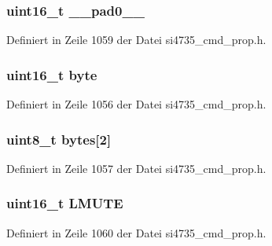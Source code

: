 \subsubsection[{\+\_\+\+\_\+pad0\+\_\+\+\_\+}]{\setlength{\rightskip}{0pt plus 5cm}uint16\+\_\+t \+\_\+\+\_\+pad0\+\_\+\+\_\+}\label{unionrx__hard__mute_a77132c2c26a75f5b8751b235cda23828}


Definiert in Zeile 1059 der Datei si4735\+\_\+cmd\+\_\+prop.\+h.

\hypertarget{unionrx__hard__mute_ab0549c1b5ea980a02e7eab77e21fea49}{}
\subsubsection[{byte}]{\setlength{\rightskip}{0pt plus 5cm}uint16\+\_\+t byte}\label{unionrx__hard__mute_ab0549c1b5ea980a02e7eab77e21fea49}


Definiert in Zeile 1056 der Datei si4735\+\_\+cmd\+\_\+prop.\+h.

\hypertarget{unionrx__hard__mute_a46e4c05d20a047ec169f60d3167e912e}{}
\subsubsection[{bytes}]{\setlength{\rightskip}{0pt plus 5cm}uint8\+\_\+t bytes\mbox{[}2\mbox{]}}\label{unionrx__hard__mute_a46e4c05d20a047ec169f60d3167e912e}


Definiert in Zeile 1057 der Datei si4735\+\_\+cmd\+\_\+prop.\+h.

\hypertarget{unionrx__hard__mute_af01ca9e8c674119ab743ec7a084a56b3}{}
\subsubsection[{L\+M\+U\+T\+E}]{\setlength{\rightskip}{0pt plus 5cm}uint16\+\_\+t L\+M\+U\+T\+E}\label{unionrx__hard__mute_af01ca9e8c674119ab743ec7a084a56b3}


Definiert in Zeile 1060 der Datei si4735\+\_\+cmd\+\_\+prop.\+h.

\hypertarget{unionrx__hard__mute_a21b48010c5f26c6dc60ad46364bc10a0}{}
